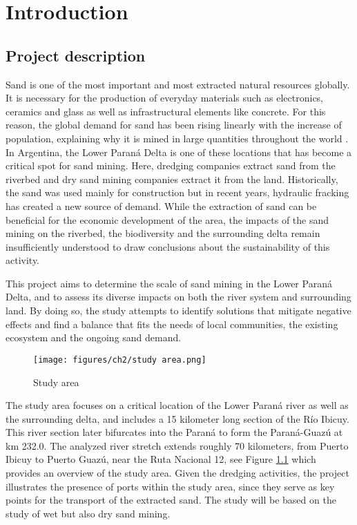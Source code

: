 \chapter{Introduction}
\label{chapter:introduction}

\section{Project description}

Sand is one of the most important and most extracted natural resources globally. It is necessary for the production of everyday materials such as electronics, ceramics and glass as well as infrastructural elements like concrete. For this reason, the global demand for sand has been rising linearly with the increase of population, explaining why it is mined in large quantities throughout the world \autocite{wwfRisingDemandSand}. 
In Argentina, the Lower Paraná Delta is one of these locations that has become a critical spot for sand mining. Here, dredging companies extract  sand from the riverbed and dry sand mining companies extract it from the land. Historically, the sand was used mainly for construction but in recent years, hydraulic fracking has created a new source of demand.
While the extraction of sand can be beneficial for the economic development of the area, the impacts of the sand mining on the riverbed, the biodiversity and the surrounding delta remain insufficiently understood to draw conclusions about the sustainability of this activity. 

This project aims to determine the scale of sand mining in the Lower Paraná Delta, and to assess its diverse impacts on both the river system and surrounding land. By doing so, the study attempts to identify solutions that mitigate negative effects and find a balance that fits the needs of local communities, the existing ecosystem and the ongoing sand demand. 

\begin{figure}[H]
    \centering    \texttt{[image: figures/ch2/study area.png]}
    \caption{Study area}
    \label{fig:study area}
\end{figure}

The study area focuses on a critical location of the Lower Paraná river as well as the surrounding delta, and includes a 15 kilometer long section of the Río Ibicuy. This river section later bifurcates into the Paraná to form the Paraná-Guazú at km 232.0. The analyzed river stretch extends roughly 70 kilometers, from Puerto Ibicuy to Puerto Guazú, near the Ruta Nacional 12, see Figure \ref{fig:study area} which provides an overview of the study area. Given the dredging activities, the project illustrates the presence of ports within the study area, since they serve as key points for the transport of the extracted sand. The study will be based on the study of wet but also dry sand mining.

